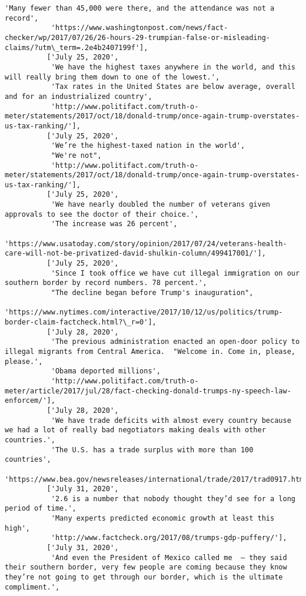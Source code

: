 \documentclass[11pt]{article}
\begin{document}
\begin{Verbatim}[commandchars=\\\{\}]
           'Many fewer than 45,000 were there, and the attendance was not a record',
           'https://www.washingtonpost.com/news/fact-checker/wp/2017/07/26/26-hours-29-trumpian-false-or-misleading-claims/?utm\_term=.2e4b2407199f'],
          ['July 25, 2020',
           'We have the highest taxes anywhere in the world, and this will really bring them down to one of the lowest.',
           'Tax rates in the United States are below average, overall and for an industrialized country',
           'http://www.politifact.com/truth-o-meter/statements/2017/oct/18/donald-trump/once-again-trump-overstates-us-tax-ranking/'],
          ['July 25, 2020',
           'We’re the highest-taxed nation in the world',
           "We're not",
           'http://www.politifact.com/truth-o-meter/statements/2017/oct/18/donald-trump/once-again-trump-overstates-us-tax-ranking/'],
          ['July 25, 2020',
           'We have nearly doubled the number of veterans given approvals to see the doctor of their choice.',
           'The increase was 26 percent',
           'https://www.usatoday.com/story/opinion/2017/07/24/veterans-health-care-will-not-be-privatized-david-shulkin-column/499417001/'],
          ['July 25, 2020',
           'Since I took office we have cut illegal immigration on our southern border by record numbers. 78 percent.',
           "The decline began before Trump's inauguration",
           'https://www.nytimes.com/interactive/2017/10/12/us/politics/trump-border-claim-factcheck.html?\_r=0'],
          ['July 28, 2020',
           'The previous administration enacted an open-door policy to illegal migrants from Central America.  "Welcome in. Come in, please, please.',
           'Obama deported millions',
           'http://www.politifact.com/truth-o-meter/article/2017/jul/28/fact-checking-donald-trumps-ny-speech-law-enforcem/'],
          ['July 28, 2020',
           'We have trade deficits with almost every country because we had a lot of really bad negotiators making deals with other countries.',
           'The U.S. has a trade surplus with more than 100 countries',
           'https://www.bea.gov/newsreleases/international/trade/2017/trad0917.htm'],
          ['July 31, 2020',
           '2.6 is a number that nobody thought they’d see for a long period of time.',
           'Many experts predicted economic growth at least this high',
           'http://www.factcheck.org/2017/08/trumps-gdp-puffery/'],
          ['July 31, 2020',
           'And even the President of Mexico called me  – they said their southern border, very few people are coming because they know they’re not going to get through our border, which is the ultimate compliment.',

\end{Verbatim}
\end{document}
